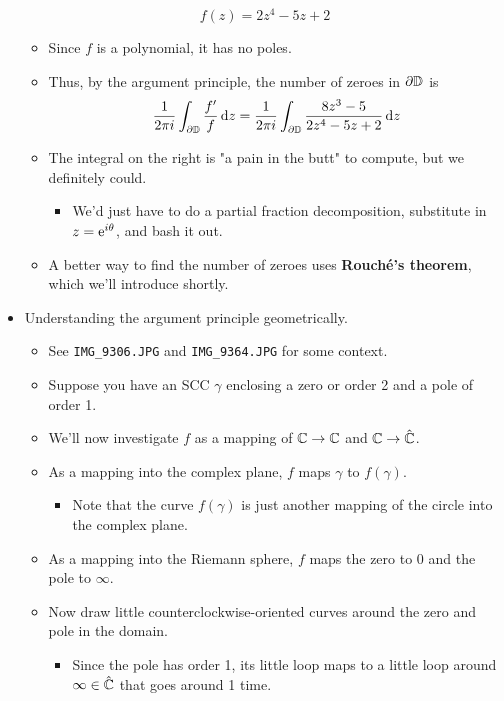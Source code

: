 \documentclass[../notes.tex]{subfiles}
\begin{document}
\begin{itemize}
\begin{equation*}
        f(z) = 2z^4-5z+2
    \end{equation*}
    \begin{itemize}
        \item Since $f$ is a polynomial, it has no poles.
        \item Thus, by the argument principle, the number of zeroes in $\partial\D$ is
        \begin{equation*}
            \frac{1}{2\pi i}\int_{\partial\D}\frac{f'}{f}\dd{z} = \frac{1}{2\pi i}\int_{\partial\D}\frac{8z^3-5}{2z^4-5z+2}\dd{z}
        \end{equation*}
        \item The integral on the right is "a pain in the butt" to compute, but we definitely could.
        \begin{itemize}
            \item We'd just have to do a partial fraction decomposition, substitute in $z=\e[i\theta]$, and bash it out.
        \end{itemize}
        \item A better way to find the number of zeroes uses \textbf{Rouch\'{e}'s theorem}, which we'll introduce shortly.
    \end{itemize}
    \item Understanding the argument principle geometrically.
    \begin{itemize}
        \item See \verb|IMG_9306.JPG| and \verb|IMG_9364.JPG| for some context.
        \item Suppose you have an SCC $\gamma$ enclosing a zero or order 2 and a pole of order 1.
        \item We'll now investigate $f$ as a mapping of $\C\to\C$ and $\C\to\hat{\C}$.
        \item As a mapping into the complex plane, $f$ maps $\gamma$ to $f(\gamma)$.
        \begin{itemize}
            \item Note that the curve $f(\gamma)$ is just another mapping of the circle into the complex plane.
        \end{itemize}
        \item As a mapping into the Riemann sphere, $f$ maps the zero to 0 and the pole to $\infty$.
        \item Now draw little counterclockwise-oriented curves around the zero and pole in the domain.
        \begin{itemize}
            \item Since the pole has order 1, its little loop maps to a little loop around $\infty\in\hat{\C}$ that goes around 1 time.

\end{itemize}
\end{itemize}
\end{itemize}
\end{document}
